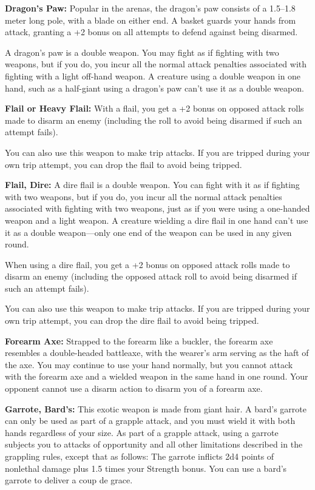 \textbf{Dragon's Paw:} Popular in the arenas, the dragon's paw consists of a 1.5--1.8 meter long pole, with a blade on either end. A basket guards your hands from attack, granting a +2 bonus on all attempts to defend against being disarmed.

A dragon's paw is a double weapon. You may fight as if fighting with two weapons, but if you do, you incur all the normal attack penalties associated with fighting with a light off-hand weapon. A creature using a double weapon in one hand, such as a half-giant using a dragon's paw can't use it as a double weapon.

\textbf{Flail or Heavy Flail:} With a flail, you get a +2 bonus on opposed attack rolls made to disarm an enemy (including the roll to avoid being disarmed if such an attempt fails).

You can also use this weapon to make trip attacks. If you are tripped during your own trip attempt, you can drop the flail to avoid being tripped. 

\textbf{Flail, Dire:} A dire flail is a double weapon. You can fight with it as if fighting with two weapons, but if you do, you incur all the normal attack penalties associated with fighting with two weapons, just as if you were using a one-handed weapon and a light weapon. A creature wielding a dire flail in one hand can't use it as a double weapon---only one end of the weapon can be used in any given round.

When using a dire flail, you get a +2 bonus on opposed attack rolls made to disarm an enemy (including the opposed attack roll to avoid being disarmed if such an attempt fails).

You can also use this weapon to make trip attacks. If you are tripped during your own trip attempt, you can drop the dire flail to avoid being tripped. 

\textbf{Forearm Axe:} Strapped to the forearm like a buckler, the forearm axe resembles a double-headed battleaxe, with the wearer's arm serving as the haft of the axe. You may continue to use your hand normally, but you cannot attack with the forearm axe and a wielded weapon in the same hand in one round. Your opponent cannot use a disarm action to disarm you of a forearm axe.

\textbf{Garrote, Bard's:} This exotic weapon is made from giant hair. A bard's garrote can only be used as part of a grapple attack, and you must wield it with both hands regardless of your size. As part of a grapple attack, using a garrote subjects you to attacks of opportunity and all other limitations described in the grappling rules, except that as follows: The garrote inflicts 2d4 points of nonlethal damage plus 1.5 times your Strength bonus. You can use a bard's garrote to deliver a coup de grace.

